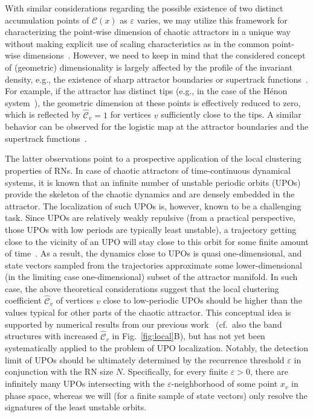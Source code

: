 \documentclass[graybox]{svmult}
\begin{document}
With similar considerations regarding the possible existence of two distinct accumulation points of $\mathcal{C}(x)$ as $\varepsilon$ varies, we may utilize this framework for characterizing the point-wise dimension of chaotic attractors in a unique way without making explicit use of scaling characteristics as in the common point-wise dimensions~\cite{Donner2011EPJB}. However, we need to keep in mind that the considered concept of (geometric) dimensionality is largely affected by the profile of the invariant density, e.g., the existence of sharp attractor boundaries or supertrack functions~\cite{Donner2010Nolta,Donner2011EPJB,Donner2010NJP}. For example, if the attractor has distinct tips (e.g., in the case of the H\'enon system~\cite{Donner2011EPJB,Donner2010NJP}), the geometric dimension at these points is effectively reduced to zero, which is reflected by $\hat{\mathcal{C}}_v=1$ for vertices $v$ sufficiently close to the tips. A similar behavior can be observed for the logistic map at the attractor boundaries and the supertrack functions~\cite{Donner2010Nolta,Donner2011EPJB,Donner2010NJP}.

The latter observations point to a prospective application of the local clustering properties of RNs. In case of chaotic attractors of time-continuous dynamical systems, it is known that an infinite number of unstable periodic orbits (UPOs) provide the skeleton of the chaotic dynamics and are densely embedded in the attractor. The localization of such UPOs is, however, known to be a challenging task. Since UPOs are relatively weakly repulsive (from a practical perspective, those UPOs with low periods are typically least unstable), a trajectory getting close to the vicinity of an UPO will stay close to this orbit for some finite amount of time~\cite{Lathrop1989}. As a result, the dynamics close to UPOs is quasi one-dimensional, and state vectors sampled from the trajectories approximate some lower-dimensional (in the limiting case one-dimensional) subset of the attractor manifold. In such case, the above theoretical considerations suggest that the local clustering coefficient $\hat{\mathcal{C}}_v$ of vertices $v$ close to low-periodic UPOs should be higher than the values typical for other parts of the chaotic attractor. This conceptual idea is supported by numerical results from our previous work~\cite{Donner2010PRE,Donner2010NJP} (cf.\, also the band structures with increased $\hat{\mathcal{C}}_v$ in Fig.~\ref{fig:local}B), but has not yet been systematically applied to the problem of UPO localization. Notably, the detection limit of UPOs should be ultimately determined by the recurrence threshold $\varepsilon$ in conjunction with the RN size $N$. Specifically, for every finite $\varepsilon>0$, there are infinitely many UPOs intersecting with the $\varepsilon$-neighborhood of some point $x_v$ in phase space, whereas we will (for a finite sample of state vectors) only resolve the signatures of the least unstable orbits.
\end{document}
